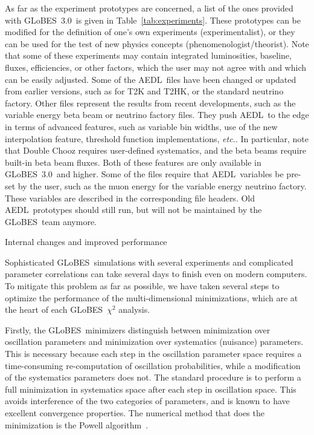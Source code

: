 \documentclass[12pt,a4paper]{article}
\makeatletter
\renewcommand{\section}{\@startsection{section}{1}{0em}{-\baselineskip}%
{\baselineskip}{\normalfont\large\bfseries}}
\newcommand{\etc}{{\it etc.}}
\newcommand{\Tab}{Table}
\newcommand{\GLOBES}{{\sf GLoBES}}
\newcommand{\GLOBESN}{{\sf GLoBES~3.0}}
\newcommand{\AEDL}{{\sf AEDL}}
\makeatother
\begin{document}
As far as the experiment prototypes are concerned, a list of the ones provided with \GLOBESN\ 
is given in \Tab~\ref{tab:experiments}. These prototypes can be modified for the definition of
one's own experiments (experimentalist), or they can be used for the test of new physics concepts
(phenomenologist/theorist).
Note that some of these experiments may contain 
integrated luminosities, baseline, fluxes, efficiencies, or other factors, which the user
may not agree with and which can be easily adjusted. Some of the \AEDL\ files have been
changed or updated from earlier versions, such as for T2K and T2HK, or the standard neutrino
factory. Other files represent the results from recent developments, such as the variable energy
beta beam or neutrino factory files. They push \AEDL\ to the edge in terms of advanced features,
such as variable bin widths, use of the new interpolation feature, threshold function implementations, \etc.
In particular, note that Double Chooz requires user-defined
systematics, and the beta beams require built-in beta beam fluxes. Both of these features are only
available in \GLOBESN\ and higher. Some of the files require that \AEDL\ variables be pre-set by the
user, such as the muon energy for the variable energy neutrino factory. These variables are
described in the corresponding file headers. Old \AEDL\ prototypes should still run, but will not
be maintained by the \GLOBES\ team anymore.

\section{Internal changes and improved performance}


Sophisticated \GLOBES\ simulations with several experiments and complicated
parameter correlations can take several days to finish even on modern computers.
To mitigate this problem as far as possible, we have taken several steps to
optimize the performance of the multi-dimensional minimizations, which are at
the heart of each \GLOBES\ $\chi^2$ analysis.

Firstly, the \GLOBES\ minimizers distinguish between minimization over
oscillation parameters and minimization over systematics (nuisance) parameters.
This is necessary because each step in the oscillation parameter space
requires a time-consuming re-computation of oscillation probabilities,
while a modification of the systematics parameters does not. The standard
procedure is to perform a full minimization in systematics space after each
step in oscillation space. This avoids interference of the two categories
of parameters, and is known to have excellent convergence properties.
The numerical method that does the minimization is the Powell
algorithm~\cite{Fletcher:1963:RCD}.
\end{document}
